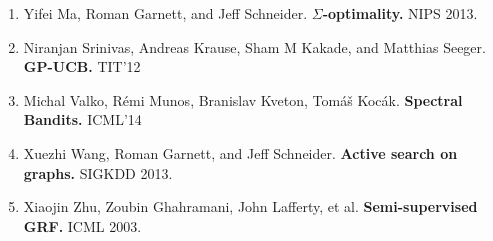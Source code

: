 \documentclass[size36_42,landscape]{a0poster}
\newcommand{\paragraphHeader}[1]{\vspace{1cm}\par{\LARGE\bf\color{darkpastelgreen} \it{\underline{\hspace{.5em}#1\hspace{.5em}}}}\par\vspace{1cm}}
\begin{document}
\begin{multicols}{3}
{\begin{enumerate}
\item
Yifei Ma, Roman Garnett, and Jeff Schneider. \textbf{$\Sigma$-optimality.} NIPS 2013. %
\item
Niranjan Srinivas, Andreas Krause, Sham M Kakade, and Matthias Seeger. \textbf{GP-UCB.} TIT'12 %
\item
Michal Valko, R{\'e}mi Munos, Branislav Kveton, Tom{\'a}{\v{s}} Koc{\'a}k. \textbf{Spectral Bandits.} ICML'14
\item
Xuezhi Wang, Roman Garnett, and Jeff Schneider. \textbf{Active search on graphs.} SIGKDD 2013.
\item
Xiaojin Zhu, Zoubin Ghahramani, John Lafferty, et al.  \textbf{Semi-supervised GRF.} ICML 2003.
\end{enumerate}
}

\end{multicols}
\end{document}

